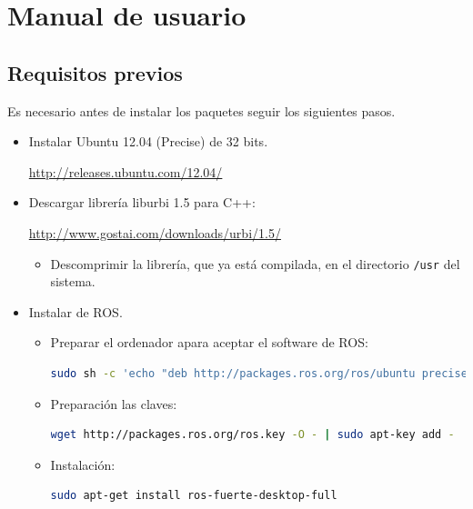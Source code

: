 \documentclass[12pt,a4paper,final,twoside]{book}
\begin{document}
\label{Referencies}
%

\appendix
\clearpage %
\addappheadtotoc

\chapter{Manual de usuario}
\thispagestyle{fancy}
\section{Requisitos previos}
Es necesario antes de instalar los paquetes seguir los siguientes pasos.

\begin{itemize}
\item Instalar Ubuntu 12.04 (Precise) de 32 bits.

\url{http://releases.ubuntu.com/12.04/}

\item Descargar librería liburbi 1.5 para C++:

\url{http://www.gostai.com/downloads/urbi/1.5/}
\begin{itemize}
\item Descomprimir la librería, que ya está compilada, en el directorio \texttt{/usr} del sistema.
\end{itemize}
\item Instalar de ROS. 

\begin{itemize}
\item Preparar el ordenador apara aceptar el software de ROS:


\begin{lstlisting}[language=bash]
  sudo sh -c 'echo "deb http://packages.ros.org/ros/ubuntu precise main" > /etc/apt/sources.list.d/ros-latest.list'
\end{lstlisting}

\item Preparación las claves:
\begin{lstlisting}[language=bash]
	wget http://packages.ros.org/ros.key -O - | sudo apt-key add -
\end{lstlisting}

\item Instalación:
\begin{lstlisting}[language=bash]
	sudo apt-get install ros-fuerte-desktop-full
\end{lstlisting}


\end{itemize}
\end{itemize}
\end{document}
